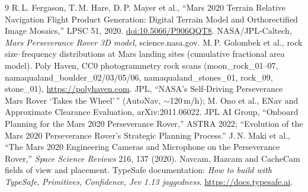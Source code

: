 \documentclass[11pt]{article}
\begin{document}
\begin{thebibliography}{9}
 R.\,L. Fergason, T.\,M. Hare, D.\,P. Mayer et al., ``Mars 2020 Terrain Relative Navigation Flight Product Generation: Digital Terrain Model and Orthorectified Image Mosaics,'' LPSC 51, 2020. \href{https://doi.org/10.5066/P906QQT8}{doi:10.5066/P906QQT8}.
 NASA/JPL-Caltech, \emph{Mars Perseverance Rover 3D model}, science.nasa.gov.
 M.\,P. Golombek et al., rock size--frequency distributions at Mars landing sites (cumulative fractional area model).
 Poly Haven, CC0 photogrammetry rock scans (moon\_rock\_01--07, namaqualand\_boulder\_02/03/05/06, namaqualand\_stones\_01, rock\_09, stone\_01), \url{https://polyhaven.com}.
 JPL, ``NASA's Self-Driving Perseverance Mars Rover `Takes the Wheel'\,'' (AutoNav, $\sim$120\,m/h); M. Ono et al., ENav and Approximate Clearance Evaluation, arXiv:2011.06022.
 JPL AI Group, ``Onboard Planning for the Mars 2020 Perseverance Rover,'' ASTRA 2022; ``Evolution of the Mars 2020 Perseverance Rover's Strategic Planning Process.''
 J.\,N. Maki et al., ``The Mars 2020 Engineering Cameras and Microphone on the Perseverance Rover,'' \emph{Space Science Reviews} 216, 137 (2020). Navcam, Hazcam and CacheCam fields of view and placement.
 TypeSafe documentation: \emph{How to build with TypeSafe}, \emph{Primitives}, \emph{Confidence}, \emph{Jev 1.13 jaggedness}. \url{https://docs.typesafe.ai}.
\end{thebibliography}
\end{document}
